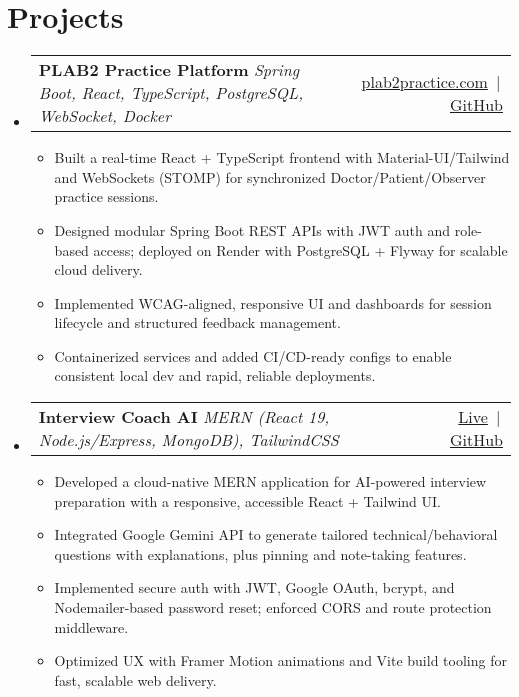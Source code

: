 \documentclass[letterpaper,11pt]{article}
\makeatletter
\newcommand{\resumeItem}[1]{\item{#1}}
\newcommand{\resumeProjectHeading}[3]{
  \vspace{2pt}\item
  \begin{tabular*}{\textwidth}[t]{l@{\extracolsep{\fill}}r}
    \textbf{#1} \textit{\small #2} & \small #3 \\
  \end{tabular*}\vspace{2pt}
}
\newcommand{\resumeItemListStart}{\begin{itemize}[leftmargin=0.15in, itemsep=2pt]}
\newcommand{\resumeItemListEnd}{\end{itemize}}
\newcommand{\resumeSubHeadingListStart}{\begin{itemize}[leftmargin=0in, label={}]}
\newcommand{\resumeSubHeadingListEnd}{\end{itemize}}
\makeatother
\begin{document}
\section*{Projects}
\resumeSubHeadingListStart
  \resumeProjectHeading
    {PLAB2 Practice Platform}{Spring Boot, React, TypeScript, PostgreSQL, WebSocket, Docker}{\href{https://plab2practice.com}{plab2practice.com} \,|\, \href{https://github.com/altansaid/plab2projectnew}{GitHub}}
    \resumeItemListStart
      \resumeItem{Built a real-time React + TypeScript frontend with Material-UI/Tailwind and WebSockets (STOMP) for synchronized Doctor/Patient/Observer practice sessions.}
      \resumeItem{Designed modular Spring Boot REST APIs with JWT auth and role-based access; deployed on Render with PostgreSQL + Flyway for scalable cloud delivery.}
      \resumeItem{Implemented WCAG-aligned, responsive UI and dashboards for session lifecycle and structured feedback management.}
      \resumeItem{Containerized services and added CI/CD-ready configs to enable consistent local dev and rapid, reliable deployments.}
    \resumeItemListEnd

  \resumeProjectHeading
    {Interview Coach AI}{MERN (React 19, Node.js/Express, MongoDB), TailwindCSS}{\href{https://interviewcoach-ai.vercel.app/}{Live} \,|\, \href{https://github.com/altansaid/interviewcoach-ai}{GitHub}}
    \resumeItemListStart
      \resumeItem{Developed a cloud-native MERN application for AI-powered interview preparation with a responsive, accessible React + Tailwind UI.}
      \resumeItem{Integrated Google Gemini API to generate tailored technical/behavioral questions with explanations, plus pinning and note-taking features.}
      \resumeItem{Implemented secure auth with JWT, Google OAuth, bcrypt, and Nodemailer-based password reset; enforced CORS and route protection middleware.}
      \resumeItem{Optimized UX with Framer Motion animations and Vite build tooling for fast, scalable web delivery.}
    \resumeItemListEnd
\resumeSubHeadingListEnd

\end{document}
